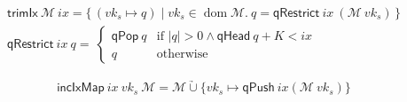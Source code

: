 \documentclass[11pt,a4paper]{article}
\DeclareMathOperator{\dom}{dom}
\newcommand\Set[2]{\{\,#1\mid#2\,\}}
\newcommand{\unionoverride}{\mathbin{\underrightarrow\cup}}
\newcommand{\fun}[1]{\mathsf{#1}}
\newcommand{\size}[1]{\left| #1 \right|}
\newcommand{\signmapname}{\mathcal{M}}
\newcommand{\trimixname}{trimIx}
\newcommand{\incixmapname}{incIxMap}
\newcommand{\qrestrname}{qRestrict}
\newcommand{\qpopname}{qPop}
\newcommand{\qheadname}{qHead}
\newcommand{\qpushname}{qPush}
\newcommand{\signmap}[1]{\fun{\signmapname} ~ #1}
\newcommand{\qrestr}[2]{\fun{\qrestrname} ~ #1 ~ #2}
\newcommand{\trimix}[2]{\fun{\trimixname} ~ #1 ~ #2}
\newcommand{\incixmap}[3]{\fun{\incixmapname} ~ #1 ~ #2 ~ #3}
\newcommand{\qpop}[1]{\fun{\qpopname} ~ #1}
\newcommand{\qhead}[1]{\fun{\qheadname} ~ #1}
\newcommand{\qpush}[1]{\fun{\qpushname} ~ #1}
\newcommand{\partialf}{\mapsto}
\begin{document}
\begin{align}
  \label{eq:trimix}
  \trimix{\signmapname}{ix} = \Set{(vk_s \partialf q)}{vk_s \in \dom \signmapname.~
  q = \qrestr{ix}{(\signmap{vk_s}})} \\
  \qrestr{ix}{q} = \
  \begin{cases}
    \qpop{q} & \text{if } \size{q} > 0 \wedge \qhead{q} + K < ix \\
    q & \text{otherwise}
  \end{cases}
\end{align}

\begin{equation}
  \label{eq:incixmap}
  \incixmap{ix}{vk_s}{\signmapname} = \signmapname \unionoverride \{vk_s \partialf \qpush{ix}{(\signmap{vk_s})}\}
\end{equation}
\end{document}
